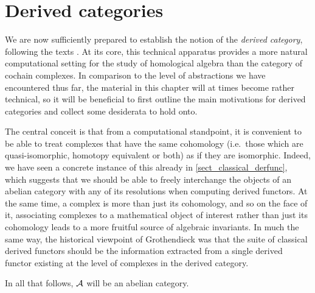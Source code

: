 \chapter{Derived categories}
\label{chap_derived_categories}

We are now sufficiently prepared to establish the notion of the
\emph{derived category}, following the texts \cite{weibel,
huybrechts, gelfand_and_manin}.
At its core, this technical apparatus provides a more natural
computational setting for the study of homological algebra than the
category of cochain complexes.
In comparison to the level of abstractions we have encountered thus
far, the material in this chapter will at times become rather
technical, so it will be beneficial to first outline the main
motivations for derived categories and collect some desiderata to hold onto.

The central conceit is that from a computational standpoint, it is
convenient to be able to treat complexes that have the same
cohomology (i.e.\ those which are quasi-isomorphic, homotopy
equivalent or both) as if they are isomorphic.
Indeed, we have seen a concrete instance of this already in
\cref{sect_classical_derfunc}, which suggests that we should be able
to freely interchange the objects of an abelian category with any of
its resolutions when computing derived functors.
At the same time, a complex is more than just its cohomology, and so
on the face of it, associating complexes to a mathematical object of
interest rather than just its cohomology leads to a more fruitful
source of algebraic invariants.
In much the same way, the historical viewpoint of Grothendieck was
that the suite of classical derived functors should be the
information extracted from a single derived functor existing at the
level of complexes in the derived category.

In all that follows, $\mathcal{A}$ will be an abelian category.





